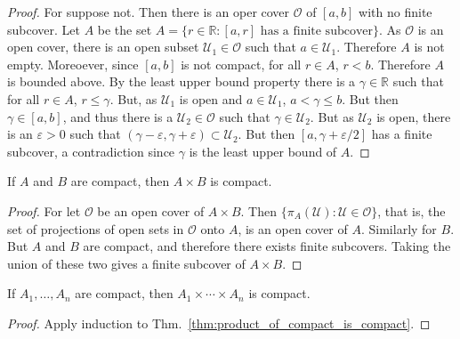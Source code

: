 \documentclass{article}                                                        %
\begin{document}
        \begin{proof}
            For suppose not. Then there is an oper cover $\mathcal{O}$ of
            $[a,b]$ with no finite subcover. Let $A$ be the set
            $A=\{r\in\mathbb{R}:[a,r]\textrm{ has a finite subcover}\}$.
            As $\mathcal{O}$ is an open cover, there is an open subset
            $\mathcal{U}_{1}\in\mathcal{O}$ such that $a\in\mathcal{U}_{1}$.
            Therefore $A$ is not empty. Moreoever, since $[a,b]$ is not compact,
            for all $r\in{A}$, $r<b$. Therefore $A$ is bounded above. By the
            least upper bound property there is a $\gamma\in\mathbb{R}$ such
            that for all $r\in{A}$, $r\leq\gamma$. But, as $\mathcal{U}_{1}$ is
            open and $a\in\mathcal{U}_{1}$, $a<\gamma\leq{b}$. But then
            $\gamma\in[a,b]$, and thus there is a
            $\mathcal{U}_{2}\in\mathcal{O}$ such that
            $\gamma\in\mathcal{U}_{2}$. But as $\mathcal{U}_{2}$ is open, there
            is an $\varepsilon>0$ such that
            $(\gamma-\varepsilon,\gamma+\varepsilon)\subset\mathcal{U}_{2}$.
            But then $[a,\gamma+\varepsilon/2]$ has a finite subcover, a
            contradiction since $\gamma$ is the least upper bound of $A$.
        \end{proof}
        \begin{theorem}
            \label{thm:product_of_compact_is_compact}%
            If $A$ and $B$ are compact, then $A\times{B}$ is compact.
        \end{theorem}
        \begin{proof}
            For let $\mathcal{O}$ be an open cover of $A\times{B}$. Then
            $\{\pi_{A}(\mathcal{U}):\mathcal{U}\in\mathcal{O}\}$, that is,
            the set of projections of open sets in $\mathcal{O}$ onto $A$,
            is an open cover of $A$. Similarly for $B$. But $A$ and $B$ are
            compact, and therefore there exists finite subcovers. Taking
            the union of these two gives a finite subcover of $A\times{B}$.
        \end{proof}
        \begin{theorem}
            \label{thm:finite_product_of_compact_is_compact}%
            If $A_{1},\hdots,A_{n}$ are compact, then
            $A_{1}\times\cdots\times{A_{n}}$ is compact.
        \end{theorem}
        \begin{proof}
            Apply induction to Thm.~\ref{thm:product_of_compact_is_compact}.
        \end{proof}
\end{document}
